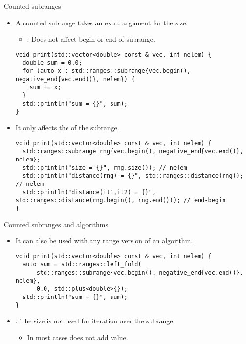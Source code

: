 \begin{frame}[t,fragile]{Counted subranges}
\begin{itemize}
  \item A counted subrange takes an extra argument for the size.
    \begin{itemize}
      \item {}: Does not affect begin or end of subrange.
    \end{itemize}
\begin{lstlisting}
void print(std::vector<double> const & vec, int nelem) {
  double sum = 0.0;
  for (auto x : std::ranges::subrange{vec.begin(), negative_end{vec.end()}, nelem}) {
    sum += x;
  }
  std::println("sum = {}", sum);
}
\end{lstlisting}

  \item It only affects the  of the subrange.
\begin{lstlisting}
void print(std::vector<double> const & vec, int nelem) {
  std::ranges::subrange rng{vec.begin(), negative_end{vec.end()}, nelem};
  std::println("size = {}", rng.size()); // nelem
  std::println("distance(rng) = {}", std::ranges::distance(rng)); // nelem
  std::println("distance(it1,it2) = {}", std::ranges::distance(rng.begin(), rng.end())); // end-begin
}
\end{lstlisting}

\end{itemize}
\end{frame}

\begin{frame}[t,fragile]{Counted subranges and algorithms}
\begin{itemize}
  \item It can also be used with any range version of an algorithm.
\begin{lstlisting}
void print(std::vector<double> const & vec, int nelem) {
  auto sum = std::ranges::left_fold(
      std::ranges::subrange{vec.begin(), negative_end{vec.end()}, nelem},
      0.0, std::plus<double>{});
  std::println("sum = {}", sum);
}
\end{lstlisting}

  \item {}: The size is not used for iteration over the subrange.
    \begin{itemize}
      \item In most cases does not add value.
    \end{itemize}

\end{itemize}
\end{frame}

